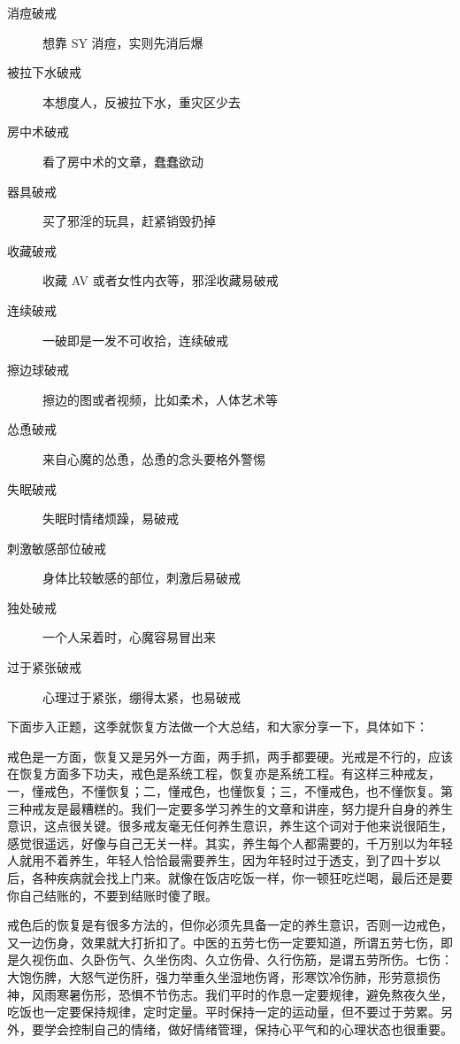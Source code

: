 \begin{adjustwidth}{-5em}{-5em}
\begin{multicols}{2}
\begin{description}
            \item[消痘破戒] 想靠 SY 消痘，实则先消后爆
            \item[被拉下水破戒] 本想度人，反被拉下水，重灾区少去
            \item[房中术破戒] 看了房中术的文章，蠢蠢欲动
            \item[器具破戒] 买了邪淫的玩具，赶紧销毁扔掉
            \item[收藏破戒] 收藏 AV 或者女性内衣等，邪淫收藏易破戒
            \item[连续破戒] 一破即是一发不可收拾，连续破戒
            \item[擦边球破戒] 擦边的图或者视频，比如柔术，人体艺术等
            \item[怂恿破戒] 来自心魔的怂恿，怂恿的念头要格外警惕
            \item[失眠破戒] 失眠时情绪烦躁，易破戒
            \item[刺激敏感部位破戒] 身体比较敏感的部位，刺激后易破戒
            \item[独处破戒] 一个人呆着时，心魔容易冒出来
            \item[过于紧张破戒] 心理过于紧张，绷得太紧，也易破戒
        \end{description}
    \end{multicols}
\end{adjustwidth}

下面步入正题，这季就恢复方法做一个大总结，和大家分享一下，具体如下：

戒色是一方面，恢复又是另外一方面，两手抓，两手都要硬。光戒是不行的，应该在恢复方面多下功夫，戒色是系统工程，恢复亦是系统工程。有这样三种戒友，一，懂戒色，不懂恢复；二，懂戒色，也懂恢复；三，不懂戒色，也不懂恢复。第三种戒友是最糟糕的。我们一定要多学习养生的文章和讲座，努力提升自身的养生意识，这点很关键。很多戒友毫无任何养生意识，养生这个词对于他来说很陌生，感觉很遥远，好像与自己无关一样。其实，养生每个人都需要的，千万别以为年轻人就用不着养生，年轻人恰恰最需要养生，因为年轻时过于透支，到了四十岁以后，各种疾病就会找上门来。就像在饭店吃饭一样，你一顿狂吃烂喝，最后还是要你自己结账的，不要到结账时傻了眼。

戒色后的恢复是有很多方法的，但你必须先具备一定的养生意识，否则一边戒色，又一边伤身，效果就大打折扣了。中医的五劳七伤一定要知道，所谓五劳七伤，即是久视伤血、久卧伤气、久坐伤肉、久立伤骨、久行伤筋，是谓五劳所伤。七伤：大饱伤脾，大怒气逆伤肝，强力举重久坐湿地伤肾，形寒饮冷伤肺，形劳意损伤神，风雨寒暑伤形，恐惧不节伤志。我们平时的作息一定要规律，避免熬夜久坐，吃饭也一定要保持规律，定时定量。平时保持一定的运动量，但不要过于劳累。另外，要学会控制自己的情绪，做好情绪管理，保持心平气和的心理状态也很重要。

